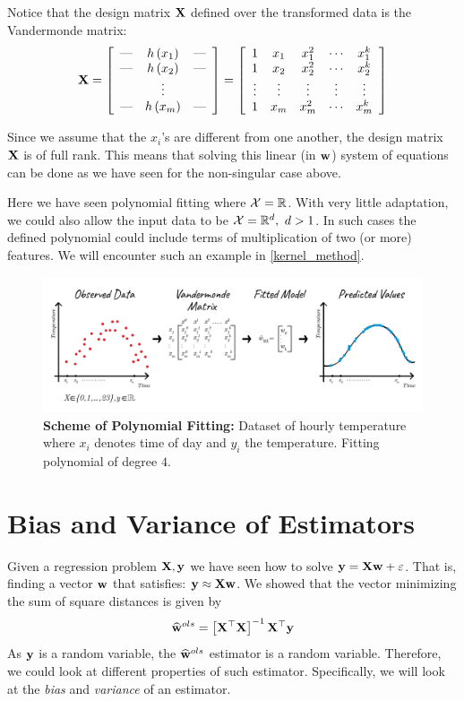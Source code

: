 Notice that the design matrix $\mathbf{X}$ defined over the transformed data is the Vandermonde matrix:
$$
\mathbf{X} =
\left[
\begin{array}{ccc}
\hbox{---} & h\left(x_1\right) & \hbox{---} \\
\hbox{---} & h\left(x_2\right) & \hbox{---} \\
& \vdots    & \\
\hbox{---} & h\left(x_m\right) & \hbox{---}
\end{array}
\right] = 
\left[
\begin{array}{ccccc}
1 & x_1 & x_1^2 & \cdots & x_1^k \\
1 & x_2 & x_2^2 & \cdots & x_2^k \\
\vdots & \vdots & \vdots & \vdots & \vdots \\
1 & x_m & x_m^2 & \cdots & x_m^k
\end{array}
\right]
$$

Since we assume that the $x_i$'s are different from one another, the design matrix $\mathbf{X}$ is of full rank. This means that solving this linear (in $\mathbf{w}$) system of equations can be done as we have seen for the non-singular case above.

\begin{remark}
Here we have seen polynomial fitting where $\mathcal{X}=\mathbb{R}$. With very little adaptation, we could also allow the input data to be $\mathcal{X}=\mathbb{R}^d,\,\,d>1$. In such cases the defined polynomial could include terms of multiplication of two (or more) features. We will encounter such an example in \ref{kernel_method}.
\end{remark}

\begin{figure}[!h]
	\centering
	\includegraphics[width=1\textwidth]{chapters/intro.regression/figures/2_6.png}
	\caption{\textbf{Scheme of Polynomial Fitting:} Dataset of hourly temperature where $x_i$ denotes time of day and $y_i$ the temperature. Fitting polynomial of degree $4$.}
\end{figure}


\section{Bias and Variance of Estimators}
Given a regression problem $\mathbf{X},\mathbf{y}$ we have seen how to solve $\mathbf{y}=\mathbf{X}\mathbf{w}+\varepsilon$. That is, finding a vector $\mathbf{w}$ that satisfies: $\mathbf{y}\approx\mathbf{X}\mathbf{w}$. We showed that the vector minimizing the sum of square distances is given by $$ \widehat{\mathbf{w}}^{ols} = \left[\mathbf{X}^\top\mathbf{X}\right]^{-1}\mathbf{X}^\top\mathbf{y} $$
As $\mathbf{y}$ is a random variable, the $\widehat{\mathbf{w}}^{ols}$ estimator is a random variable. Therefore, we could look at different properties of such estimator. Specifically, we will look at the \textit{bias} and \textit{variance} of an estimator.
~\\

